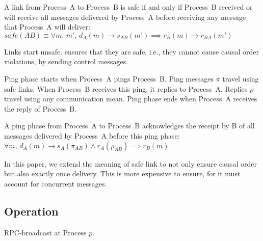 \begin{definition} 
  A link from Process~A to Process~B is safe if and only if Process~B received
  or will receive all messages delivered by Process~A before receiving any
  message that Process~A will
  deliver: $safe(AB) \equiv \forall m,\, m',\, d_A(m) \rightarrow s_{AB}(m')
  \implies r_B(m) \rightarrow r_{BA}(m')$
\end{definition}

Links start unsafe. \PCBROADCAST ensures that they are safe, i.e., they cannot
cause causal order violations, by sending control messages.

\begin{definition}
  Ping phase starts when Process~A pings Process~B. Ping messages $\pi$ travel
  using safe links. When Process~B receives this ping, it replies to
  Process~A. Replies $\rho$ travel using any communication mean. Ping phase ends
  when Process~A receives the reply of Process~B.
\end{definition}

\begin{lemma}
  A ping phase from Process~A to Process~B acknowledges the receipt by B of all
  messages delivered by Process~A before this ping phase:
  $\forall m,\, d_A(m) \rightarrow s_A(\pi_{AB}) \wedge r_A(\rho_{AB}) \implies
  r_B(m)$
\end{lemma}


In this paper, we extend the meaning of safe link to not only ensure causal
order but also exactly once delivery. This is more expensive to ensure, for it
must account for concurrent messages. 



\subsection{Operation}

\begin{algorithm}[h]
  
  \caption{\label{algo:rpcbroadcast}RPC-broadcast at Process $p$.}
\end{algorithm}

